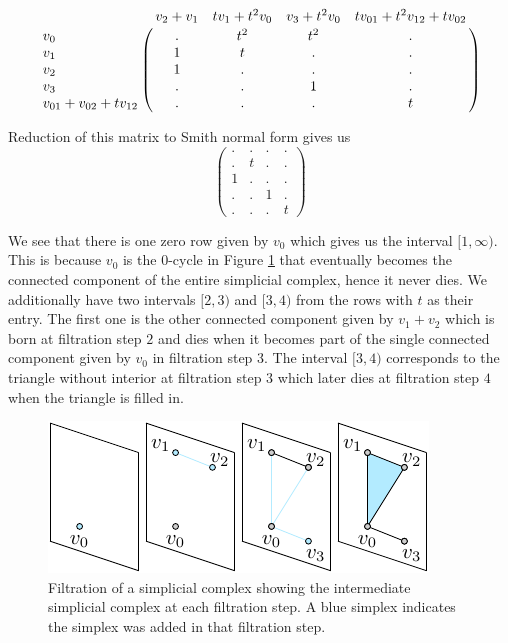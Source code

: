 \begin{example}
  \[
    \bordermatrix{& v_{2}+v_{1} & tv_{1}+t^{2}v_{0} & v_{3}+t^{2}v_{0} & tv_{01}+t^{2}v_{12}+tv_{02} \cr
      v_{0} & . & t^{2} & t^{2} & . \cr
      v_{1} & 1 & t & . & .     \cr
      v_{2} & 1 & . & . & .     \cr
      v_{3} & . & . & 1 & .     \cr
      v_{01}+v_{02}+tv_{12}  & . & . & . & t
      }
  \]

  Reduction of this matrix to Smith normal form gives us
  \[
    \begin{pmatrix}
      . & . & . & . \\
      . & t & . & .     \\
        1 & . & . & .     \\
        . & . & 1 & .     \\
        . & . & . & t
        \end{pmatrix}
  \]

 We see that there is one zero row given by $v_{0}$ which gives us the interval $[1,\infty)$. This is because $v_{0}$ is the $0$-cycle in Figure \ref{filtrationstack} that eventually becomes the connected component of the entire simplicial complex, hence it never dies. We additionally have two intervals $[2,3)$ and $[3,4)$ from the rows with $t$ as their entry. The first one is the other connected component given by $v_{1}+v_{2}$ which is born at filtration step $2$ and dies when it becomes part of the single connected component given by $v_{0}$ in filtration step 3. The interval $[3,4)$ corresponds to the triangle without interior at filtration step $3$ which later dies at filtration step $4$ when the triangle is filled in.


\begin{figure}[ht]
  \centering
  \includegraphics[scale=1.5]{simp_filt.pdf}
  \caption{\label{filtrationstack} Filtration of a simplicial complex showing the intermediate simplicial complex at each filtration step. A blue simplex indicates the simplex was added in that filtration step.}
\end{figure}

\end{example}

